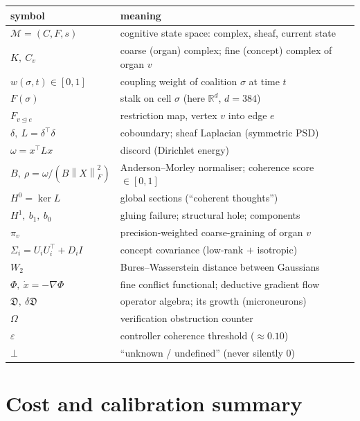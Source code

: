 \documentclass[11pt]{article}
\theoremstyle{definition}
\theoremstyle{plain}
\theoremstyle{remark}
\newcommand{\M}{\mathcal{M}}
\newcommand{\CC}{C}                 %
\newcommand{\Kc}{K}                 %
\newcommand{\Fs}{F}                 %
\newcommand{\Rd}{\mathbb{R}^{d}}
\newcommand{\Dop}{\mathfrak{D}}     %
\newcommand{\rest}[1]{F_{#1}}
\newcommand{\norm}[1]{\left\lVert #1 \right\rVert}
\newcommand{\triang}{\trianglelefteq}
\newcommand{\Hzero}{H^{0}}
\newcommand{\Hone}{H^{1}}
\begin{document}
\begin{center}
\renewcommand{\arraystretch}{1.2}
\begin{tabular}{@{}ll@{}}
\hline
symbol & meaning\\
\hline
$\M=(\CC,\Fs,s)$ & cognitive state space: complex, sheaf, current state\\
$\Kc,\ \CC_v$ & coarse (organ) complex; fine (concept) complex of organ $v$\\
$w(\sigma,t)\in[0,1]$ & coupling weight of coalition $\sigma$ at time $t$\\
$\Fs(\sigma)$ & stalk on cell $\sigma$ (here $\Rd$, $d=384$)\\
$\rest{v\triang e}$ & restriction map, vertex $v$ into edge $e$\\
$\delta,\ L=\delta^\top\delta$ & coboundary; sheaf Laplacian (symmetric PSD)\\
$\omega=x^\top Lx$ & discord (Dirichlet energy)\\
$B,\ \rho=\omega/(B\norm{X}_F^2)$ & Anderson--Morley normaliser; coherence score $\in[0,1]$\\
$\Hzero=\ker L$ & global sections (``coherent thoughts'')\\
$\Hone,\ b_1,\ b_0$ & gluing failure; structural hole; components\\
$\pi_v$ & precision-weighted coarse-graining of organ $v$\\
$\Sigma_i=U_iU_i^\top+D_iI$ & concept covariance (low-rank $+$ isotropic)\\
$W_2$ & Bures--Wasserstein distance between Gaussians\\
$\Phi,\ \dot x=-\nabla\Phi$ & fine conflict functional; deductive gradient flow\\
$\Dop,\ \delta\Dop$ & operator algebra; its growth (microneurons)\\
$\Omega$ & verification obstruction counter\\
$\varepsilon$ & controller coherence threshold ($\approx 0.10$)\\
$\bot$ & ``unknown / undefined'' (never silently $0$)\\
\hline
\end{tabular}
\end{center}

\section{Cost and calibration summary}\label{app:cost}
\end{document}
